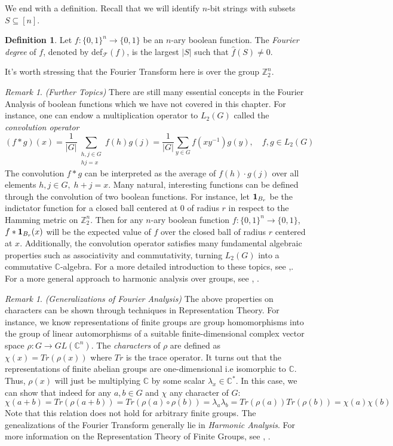 \documentclass{amsart}
\theoremstyle{definition}
\newtheorem{definition}[theorem]{Definition}
\theoremstyle{remark}
\newtheorem{remark}[theorem]{Remark}
\numberwithin{equation}{section}
\theoremstyle{remark}
\begin{document}
\noindent We end with a definition. Recall that we will identify $n$-bit strings with subsets $S \subseteq [n]$.
%
\begin{definition}
  Let $f:\{0,1\}^n \rightarrow \{0,1\}$ be an $n$-ary boolean function. The \emph{Fourier degree} of $f$, denoted by def$_{\mathcal{F}}(f)$, is the largest $|S|$ such that $\hat{f}(S) \neq 0$.
\end{definition}
%
\noindent It's worth stressing that the Fourier Transform here is over the group $\mathbb{Z}_2^n$.

\begin{remark}{\emph{(Further Topics)}}
  There are still many essential concepts in the Fourier Analysis of boolean functions which we have not covered in this chapter. For instance, one can endow a multiplication operator to $L_2(G)$ called the \emph{convolution operator}
  $$ (f * g)(x) = \frac{1}{|G|}\sum_{\substack{h,j \in G \\ hj = x}} f(h)g(j) = \frac{1}{|G|}\sum_{y \in G} f(xy^{-1})g(y), \quad f,g \in L_2(G)$$
   The convolution $f * g$ can be interpreted as the average of $f(h)\cdot g(j)$ over all elements $h,j \in G, \; h + j = x$. Many natural, interesting functions can be defined through the convolution of two boolean functions. For instance, let ${\bf 1}_{B_r}$ be the indictator function for a closed ball centered at $0$ of radius $r$ in respect to the Hamming metric on $\mathbb{Z}_2^n$. Then for any $n$-ary boolean function $f:\{0,1\}^n \rightarrow \{0,1\}$, $f * {\bf 1}_{B_r}(x)$ will be the expected value of $f$ over the closed ball of radius $r$ centered at $x$. Additionally, the convolution operator satisfies many fundamental algebraic properties such as associativity and commutativity, turning $L_2(G)$ into a commutative $\mathbb{C}$-algebra.
   For a more detailed introduction to these topics, see \cite{hatami},\cite{odonnell}. For a more general approach to harmonic analysis over groups, see \cite{rudin}, \cite{ceccherini}.
\end{remark}

\begin{remark}{\emph{(Generalizations of Fourier Analysis)}}
The above properties on characters can be shown through techniques in Representation Theory. For instance, we know representations of finite groups are group homomorphisms into the group of linear automorphisms of a suitable finite-dimensional complex vector space $\rho: G \rightarrow GL(\mathbb{C}^n)$. The \emph{characters} of $\rho$ are defined as $\chi(x) = Tr(\rho(x))$ where $Tr$ is the trace operator. It turns out that the representations of finite abelian groups are one-dimensional i.e isomorphic to $\mathbb{C}$. Thus, $\rho(x)$ will just be multiplying $\mathbb{C}$ by some scalar $\lambda_x \in \mathbb{C}^*$. In this case, we can show that indeed for any $a,b \in G$ and $\chi$ any character of $G$:
$$ \chi(a+b) = Tr(\rho(a+b)) = Tr(\rho(a)\circ\rho(b)) = \lambda_a \lambda_b = Tr(\rho(a))Tr(\rho(b)) = \chi(a)\chi(b)$$ Note that this relation does not hold for arbitrary finite groups. The genealizations of the Fourier Transform generally lie in \emph{Harmonic Analysis}. For more information on the Representation Theory of Finite Groups, see \cite{serre}, \cite{webb}.
\end{remark}
\end{document}
